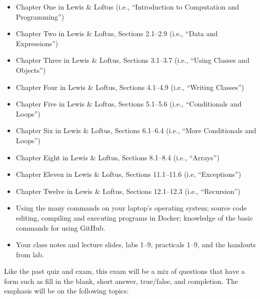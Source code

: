 \documentclass[11pt]{article}
\begin{document}
\begin{itemize}

  \itemsep 0in

  \item Chapter One in Lewis \& Loftus (i.e., ``Introduction to Computation and Programming'')

  \item Chapter Two in Lewis \& Loftus, Sections 2.1--2.9 (i.e., ``Data and Expressions'')

  \item Chapter Three in Lewis \& Loftus, Sections 3.1--3.7 (i.e., ``Using Classes and Objects'')

  \item Chapter Four in Lewis \& Loftus, Sections 4.1--4.9 (i.e., ``Writing Classes'')

  \item Chapter Five in Lewis \& Loftus, Sections 5.1--5.6 (i.e., ``Conditionals and Loops'')

  \item Chapter Six in Lewis \& Loftus, Sections 6.1--6.4 (i.e., ``More Conditionals and Loops'')

  \item Chapter Eight in Lewis \& Loftus, Sections 8.1--8.4 (i.e., ``Arrays'')

  \item Chapter Eleven in Lewis \& Loftus, Sections 11.1--11.6 (i.e, ``Exceptions'')

  \item Chapter Twelve in Lewis \& Loftus, Sections 12.1--12.3 (i.e., ``Recursion'')

  \item Using the many commands on your laptop's operating system; source code
    editing, compiling and executing programs in Docker; knowledge of the basic
    commands for using GitHub.



  \item Your class notes and lecture slides, labs 1--9, practicals 1--9, and the
    handouts from lab.

\end{itemize}

\noindent Like the past quiz and exam, this exam will be a mix of questions that
have a form such as fill in the blank, short answer, true/false, and completion.
The emphasis will be on the following topics:
\end{document}

